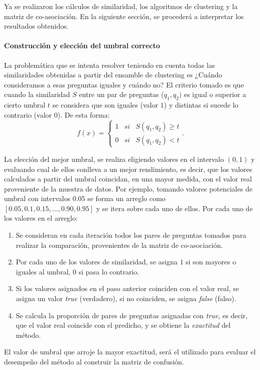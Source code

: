 Ya se realizaron los cálculos de similaridad, los algoritmos de clustering y la matriz de co-asociación. En la siguiente sección, se procederá a interpretar los resultados obtenidos.

\paragraph{Construcción y elección del umbral correcto}
La problemática que se intenta resolver teniendo en cuenta todas las similaridades obtenidas a partir del ensamble de clustering es ¿Cuándo consideramos a esas preguntas iguales y cuándo no? El criterio tomado es que cuando la similaridad \(S\) entre un par de preguntas (\(q_1,q_2)\) es igual o superior a cierto umbral \(t\) se considera que son iguales (valor \(1\)) y distintas si sucede lo contrario (valor \(0\)). De esta forma:
\[f(x) = \left\{ \begin{array}{lcc} 1 & si & S(q_1, q_2)\geq t
	\\ 0 & si & S(q_1, q_2) < t
\end{array} \right..\]

La elección del mejor umbral, se realiza eligiendo valores en el intervalo \((0,1)\) y evaluando cual de ellos conlleva a un mejor rendimiento, es decir, que los valores calculados a partir del umbral coincidan, en una mayor medida, con el valor real proveniente de la muestra de datos. Por ejemplo, tomando valores potenciales de umbral con intervalos \(0.05\) se forma un arreglo como \([0.05, 0.1, 0.15, ..., 0.90, 0.95]\) y se itera sobre cada uno de ellos. Por cada uno de los valores en el arreglo:
\begin{enumerate}
	\item Se consideran en cada iteración todos los pares de preguntas tomados para realizar la comparación, provenientes de la matriz de co-asociación.
	\item Por cada uno de los valores de similaridad, se asigna \(1\) si son mayores o iguales al umbral, \(0\) si pasa lo contrario.
	\item Si los valores asignados en el paso anterior coinciden con el valor real, se asigna un valor \textit{true} (verdadero), si no coinciden, se asigna \textit{false} (falso).
	\item Se calcula la proporción de pares de preguntas asignadas con \textit{true}, es decir, que el valor real coincide con el predicho, y se obtiene la \textit{exactitud} del método.
\end{enumerate}
El valor de umbral que arroje la mayor exactitud, será el utilizado para evaluar el desempeño del método al construir la matriz de confusión.

